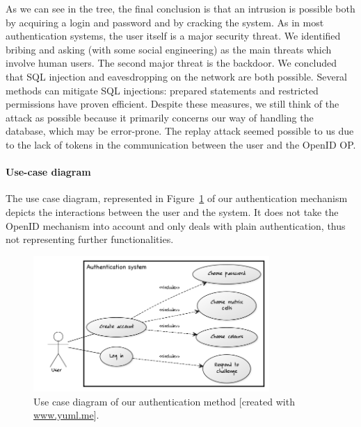 \documentclass[11pt,a4paper]{article}
\begin{document}
As we can see in the tree, the final conclusion is that an intrusion is possible both by acquiring a login and password and by cracking the system. As in most authentication systems, the user itself is a major security threat. We identified bribing and asking (with some social engineering) as the main threats which involve human users. The second major threat is the backdoor.
We concluded that SQL injection and eavesdropping on the network are both possible. Several methods can mitigate SQL injections: prepared statements and restricted permissions have proven efficient. Despite these measures, we still think of the attack as possible because it primarily concerns our way of handling the database, which may be error-prone.
The replay attack seemed possible to us due to the lack of tokens in the communication between the user and the OpenID OP.


\paragraph{Use-case diagram} The use case diagram, represented in Figure~\ref{fig:usecasedia} of our authentication mechanism depicts the interactions between the user and the system. It does not take the OpenID mechanism into account and only deals with plain authentication, thus not representing further functionalities.
\begin{figure}
\centering
\includegraphics[width=0.8\textwidth]{usecasedia.png}
\caption{Use case diagram of our authentication method [created with \url{www.yuml.me}].}
\label{fig:usecasedia}
\end{figure}
\end{document}

